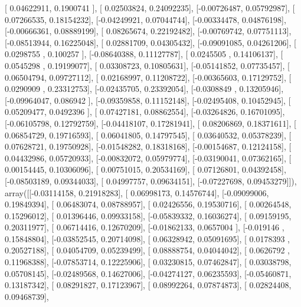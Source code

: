 \documentclass{article}
\begin{document}
       [ 0.04622911,  0.1900741 ],
       [ 0.02503824,  0.24092235],
       [-0.00726487,  0.05792987],
       [ 0.07266535,  0.18154232],
       [-0.04249921,  0.07044744],
       [-0.00334478,  0.04876198],
       [-0.00666361,  0.08889199],
       [ 0.08265674,  0.22192482],
       [-0.00769742,  0.07751113],
       [-0.08513944,  0.16225048],
       [ 0.02881709,  0.04305432],
       [-0.09091085,  0.04261206],
       [ 0.0298755 ,  0.100257  ],
       [-0.08640388,  0.11127787],
       [ 0.0245505 ,  0.14106137],
       [ 0.0545298 ,  0.19199077],
       [ 0.03308723,  0.10805631],
       [-0.05141852,  0.07735457],
       [ 0.06504794,  0.09727112],
       [ 0.02168997,  0.11208722],
       [-0.00365603,  0.17129752],
       [ 0.0290909 ,  0.23312753],
       [-0.02435705,  0.23392054],
       [-0.0308849 ,  0.13205946],
       [-0.09964047,  0.086942  ],
       [-0.09359858,  0.11152148],
       [-0.02495408,  0.10452945],
       [ 0.05209477,  0.0492396 ],
       [ 0.07427181,  0.08862554],
       [-0.03264826,  0.16701095],
       [-0.06105798,  0.12792759],
       [-0.04418107,  0.17281941],
       [ 0.08206869,  0.18371611],
       [ 0.06854729,  0.19716593],
       [ 0.06041805,  0.14797545],
       [ 0.03640532,  0.05378239],
       [ 0.07628721,  0.19750928],
       [-0.01548282,  0.18318168],
       [-0.00154687,  0.12124158],
       [ 0.04432986,  0.05720933],
       [-0.00832072,  0.05979774],
       [-0.03190041,  0.07362165],
       [ 0.00154445,  0.10306096],
       [ 0.00751015,  0.20534169],
       [ 0.07126801,  0.04392458],
       [-0.08503189,  0.09344033],
       [ 0.04997757,  0.09634151],
       [-0.07227698,  0.09453279]]), array([[-0.03114158,  0.21918283],
       [ 0.06998173,  0.14576744],
       [-0.09099006,  0.19849394],
       [ 0.06483074,  0.08788957],
       [ 0.02426556,  0.19530716],
       [ 0.00264548,  0.15296012],
       [ 0.01396446,  0.09933158],
       [-0.05839332,  0.16036274],
       [ 0.09159195,  0.20311977],
       [ 0.06714416,  0.12670209],
       [-0.01862133,  0.0657004 ],
       [-0.019146  ,  0.15848804],
       [-0.03852545,  0.20714098],
       [ 0.06328942,  0.05091695],
       [ 0.0178393 ,  0.20527188],
       [ 0.04054709,  0.05239499],
       [ 0.08888754,  0.04044042],
       [ 0.0626792 ,  0.11968388],
       [-0.07853714,  0.12225906],
       [ 0.03230815,  0.07462847],
       [ 0.03038798,  0.05708145],
       [-0.02489568,  0.14627006],
       [-0.04274127,  0.06235593],
       [-0.05460871,  0.13187342],
       [ 0.08291827,  0.17123967],
       [ 0.08992264,  0.07874873],
       [ 0.02824408,  0.09468739],
\end{document}
